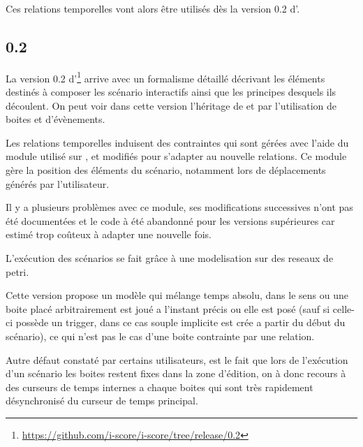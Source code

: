 Ces relations temporelles vont alors être utilisés dès la version 0.2 d'\iscore{}.

\subsection{\iscore{} 0.2}

La version 0.2 d'\iscore{}\footnote{\url{https://github.com/i-score/i-score/tree/release/0.2}} arrive avec un formalisme détaillé\cite{hogue2014ossia} décrivant les éléments destinés à composer les scénario interactifs ainsi que les principes desquels ils découlent. On peut voir  dans cette version l'héritage de \boxes{} et \openmusic{} par l'utilisation de boites et d'évènements.


Les relations temporelles induisent des contraintes qui sont gérées avec l'aide du module \csp{} utilisé sur \boxes{}, et modifiés pour s'adapter au nouvelle relations. Ce module gère la position des éléments du scénario, notamment lors de déplacements générés par l'utilisateur.

Il y a plusieurs problèmes avec ce module, ses modifications successives n'ont pas été documentées et le code à été abandonné pour les versions supérieures car estimé trop coûteux à adapter une nouvelle fois.

L'exécution des scénarios se fait grâce à une modelisation sur des reseaux de petri.

Cette version propose un modèle qui mélange temps absolu, dans le sens ou une boite placé arbitrairement est joué a l'instant précis ou elle est posé (sauf si celle-ci possède un trigger, dans ce cas souple implicite est crée a partir du début du scénario), ce qui n'est pas le cas d'une boite contrainte par une relation.

Autre défaut constaté par certains utilisateurs, est le fait que lors de l'exécution d'un scénario les boites restent fixes dans la zone d'édition, on à donc recours à des curseurs de temps internes a chaque boites qui sont très rapidement désynchronisé du curseur de temps principal.


